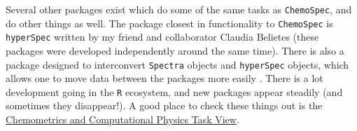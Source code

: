 \documentclass[letter,10pt,twocolumn,twoside,printwatermark=false]{pinp}
\begin{document}
Several other packages exist which do some of the same tasks as
\texttt{ChemoSpec}, and do other things as well. The package closest in
functionality to \texttt{ChemoSpec} is \texttt{hyperSpec} written by my
friend and collaborator Claudia Belietes (these packages were developed
independently around the same time).\citep{hyperSpec-pkg} There is also
a package designed to interconvert \texttt{Spectra} objects and
\texttt{hyperSpec} objects, which allows one to move data between the
packages more easily \citep{hCB-pkg}. There is a lot development going
in the \texttt{R} ecosystem, and new packages appear steadily (and
sometimes they disappear!). A good place to check these things out is
the
\href{http://cran.at.r-project.org/web/views/ChemPhys.html}{Chemometrics and Computational Physics Task View}.

\showacknow

\pnasbreak 



\end{document}
